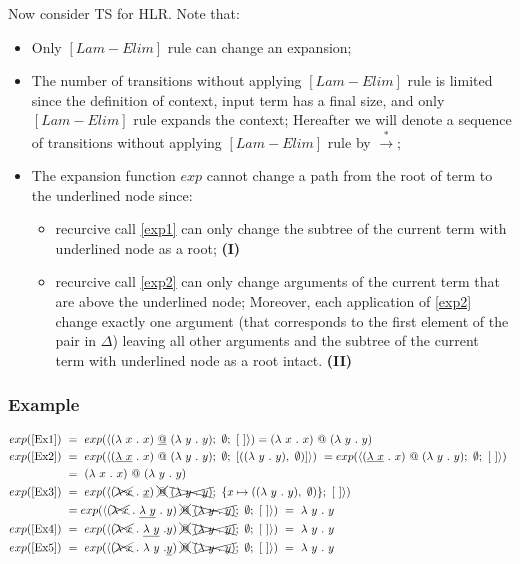 \documentclass[a4paper, 10pt]{article}
\begin{document}
Now consider TS for HLR. Note that:
\begin{itemize}
\item Only $[Lam-Elim]$ rule can change an expansion;
\item The number of transitions without applying $[Lam-Elim]$ rule is limited since the definition of context, input term has a final size, and only $[Lam-Elim]$ rule expands the context; Hereafter we will denote a sequence of transitions without applying $[Lam-Elim]$ rule by $\overset{*}{\rightarrow}$;
\item The expansion function $exp$ cannot change a path from the root of term to the underlined node since:
  \begin{itemize}
  \item recurcive call \eqref{exp1} can only change the subtree of the current term with underlined node as a root; \hfill{\textbf{(I)}}
  \item recurcive call \eqref{exp2} can only change arguments of the current term that are above the underlined node; Moreover, each application of \eqref{exp2} change exactly one argument (that corresponds to the first element of the pair in $\Delta$) leaving all other arguments and the subtree of the current term with underlined node as a root intact. \hfill{\textbf{(II)}}
  \end{itemize}
\end{itemize}

\subsubsection{Example}
\begin{align*}
  exp (\textnormal{\eqref{Ex1}})\ & =\  exp (\langle (\lambda \ x\ .\ x)\ \underline{@}\ (\lambda \ y\ .\  y);\ \emptyset;\ [\ ]
  \rangle) =  (\lambda \ x\ .\ x)\ @\ (\lambda \ y\ .\  y) \\
  exp (\textnormal{\eqref{Ex2}})\ & =\ exp ( \langle (\underline{\lambda \ x}\ .\ x)\ @\ (\lambda \ y\ .\  y);\ \emptyset;\
  [((\lambda\ y\ .\ y),\ \emptyset)] \rangle)\ =
  exp ( \langle (\underline{\lambda \ x}\ .\ x)\ @\ (\lambda \ y\ .\  y);\ \emptyset;\
  [\ ]  \rangle)\ \\ & = \ (\lambda \ x\ .\ x)\ @\ (\lambda \ y\ .\  y) \\
  exp (\textnormal{\eqref{Ex3}})\ & =\ exp ( \langle (\xcancel{\lambda \ x}\ .\ \underline{x})\ \xcancel{@}\
  \xcancel{(\lambda \ y\ .\  y)};\ \{x \mapsto ((\lambda\ y\ .\ y),\ \emptyset)\};\ [\ ] \rangle ) \\
  & =  exp ( \langle (\xcancel{\lambda \ x}\ .\ \underline{\lambda\ y}\ .\ y)\ \xcancel{@}\
  \xcancel{(\lambda \ y\ .\  y)};\ \emptyset;\ [\ ] \rangle )\ =\ \lambda\ y\ .\ y\\
  exp (\textnormal{\eqref{Ex4}})\ & =\ exp (\langle (\xcancel{\lambda \ x}\ .\ \underline{\lambda \ y}\ . y )\
  \xcancel{@}\ \xcancel{(\lambda \ y\ .\  y)};\ \emptyset; \ [\ ] \rangle)\ =\ \lambda \ y\ .\ y \\
  exp (\textnormal{\eqref{Ex5}})\ & =\ exp (\langle (\xcancel{\lambda \ x}\ .\ \lambda \ y\ . \underline{y} )\
  \xcancel{@}\ \xcancel{(\lambda \ y\ .\  y)};\ \emptyset; \ [\ ] \rangle) \ = \ \lambda \ y\ .\ y
\end{align*}
\end{document}
